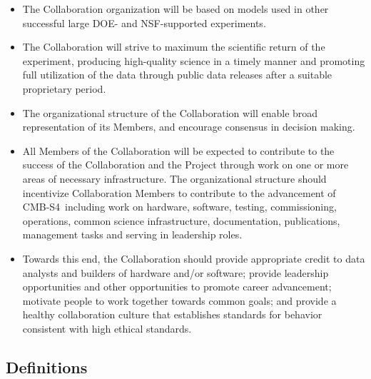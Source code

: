 \documentclass[12pt]{article}
\newcommand\collabname{CMB-S4}
\begin{document}
\begin{itemize}
\item The Collaboration organization will be based on models used in other successful  large DOE- and NSF-supported experiments.  %

\item The Collaboration will strive to maximum the scientific return of the experiment, producing high-quality science in a timely manner and promoting full utilization of the data through public data releases after a suitable proprietary period.

\item The organizational structure of the Collaboration will enable broad representation of its Members, and encourage consensus in decision making. %

\item   All Members of the Collaboration will be expected to contribute to the success of the Collaboration and the Project through work on one or more areas of necessary infrastructure. The organizational structure should incentivize Collaboration Members to contribute to the advancement of \collabname\  including work on hardware, software, testing, commissioning, operations, common science infrastructure, documentation,  publications,  management tasks and serving in leadership roles.


\item Towards this end, the Collaboration should provide appropriate credit to data analysts and builders of hardware and/or software; provide leadership opportunities and other opportunities to promote career advancement; motivate people to work together towards common goals; %
and provide a healthy collaboration culture that establishes standards for behavior consistent with high ethical standards.

\end{itemize}


\subsection{Definitions}
\end{document}
